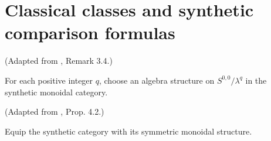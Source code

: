 \section{Classical classes and synthetic comparison formulas}
\begin{definition}
\label{frontier:Literature:63eb956dffc1}
(Adapted from \cite{LWX126}, Remark 3.4.)\par{}

For each positive integer $q$, choose an algebra structure on $S^{0,0}/\lambda^q$ in the synthetic monoidal category.
\end{definition}

\begin{definition}
\label{frontier:Literature:73db85fe3f01}
(Adapted from \cite{Pst}, Prop. 4.2.)\par{}

Equip the synthetic category with its symmetric monoidal structure.
\end{definition}

